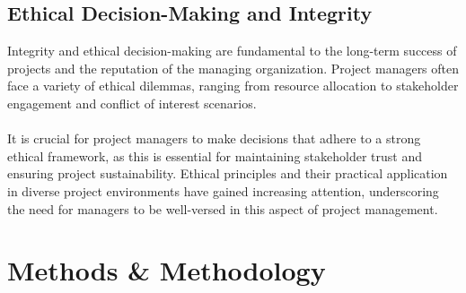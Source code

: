 \documentclass{article}
\begin{document}
\subsection{Ethical Decision-Making and Integrity}
Integrity and ethical decision-making are fundamental to the long-term success of projects and the reputation of the managing organization. Project managers often face a variety of ethical dilemmas, ranging from resource allocation to stakeholder engagement and conflict of interest scenarios. \\\\It is crucial for project managers to make decisions that adhere to a strong ethical framework, as this is essential for maintaining stakeholder trust and ensuring project sustainability. Ethical principles and their practical application in diverse project environments have gained increasing attention, underscoring the need for managers to be well-versed in this aspect of project management\cite{Project_Management_Techniques}.


\newpage
\section{Methods \& Methodology}
\end{document}
